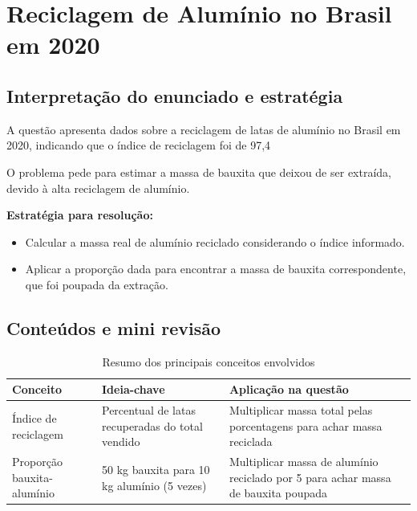 \documentclass{article}
\begin{document}
\section*{Reciclagem de Alumínio no Brasil em 2020}

\subsection*{Interpretação do enunciado e estratégia}
A questão apresenta dados sobre a reciclagem de latas de alumínio no Brasil em 2020, indicando que o índice de reciclagem foi de 97,4%

O problema pede para estimar a massa de bauxita que deixou de ser extraída, devido à alta reciclagem de alumínio.

\textbf{Estratégia para resolução:}
\begin{itemize}
  \item Calcular a massa real de alumínio reciclado considerando o índice informado.
  \item Aplicar a proporção dada para encontrar a massa de bauxita correspondente, que foi poupada da extração.
\end{itemize}

\subsection*{Conteúdos e mini revisão}
\begin{table}[h!]
\centering
\begin{tabular}{|l|p{8cm}|p{6cm}|}
\hline
\textbf{Conceito} & \textbf{Ideia-chave} & \textbf{Aplicação na questão} \\
\hline
Índice de reciclagem & Percentual de latas recuperadas do total vendido & Multiplicar massa total pelas porcentagens para achar massa reciclada \\
\hline
Proporção bauxita-alumínio & 50 kg bauxita para 10 kg alumínio (5 vezes) & Multiplicar massa de alumínio reciclado por 5 para achar massa de bauxita poupada \\
\hline
\end{tabular}
\caption{Resumo dos principais conceitos envolvidos}
\end{table}
\end{document}
